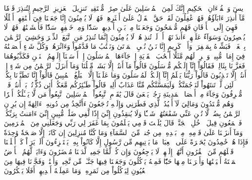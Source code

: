 يسٓ
وَٱلۡقُرۡءَانِ ٱلۡحَكِيمِ
إِنَّكَ لَمِنَ ٱلۡمُرۡسَلِينَ
عَلَىٰ صِرَٰطٖ مُّسۡتَقِيمٖ
تَنزِيلَ ٱلۡعَزِيزِ ٱلرَّحِيمِ
لِتُنذِرَ قَوۡمٗا مَّآ أُنذِرَ ءَابَآؤُهُمۡ فَهُمۡ غَٰفِلُونَ
لَقَدۡ حَقَّ ٱلۡقَوۡلُ عَلَىٰٓ أَكۡثَرِهِمۡ فَهُمۡ لَا يُؤۡمِنُونَ
إِنَّا جَعَلۡنَا فِيٓ أَعۡنَٰقِهِمۡ أَغۡلَٰلٗا فَهِيَ إِلَى ٱلۡأَذۡقَانِ فَهُم مُّقۡمَحُونَ
وَجَعَلۡنَا مِنۢ بَيۡنِ أَيۡدِيهِمۡ سَدّٗا وَمِنۡ خَلۡفِهِمۡ سَدّٗا فَأَغۡشَيۡنَٰهُمۡ فَهُمۡ لَا يُبۡصِرُونَ
وَسَوَآءٌ عَلَيۡهِمۡ ءَأَنذَرۡتَهُمۡ أَمۡ لَمۡ تُنذِرۡهُمۡ لَا يُؤۡمِنُونَ
إِنَّمَا تُنذِرُ مَنِ ٱتَّبَعَ ٱلذِّكۡرَ وَخَشِيَ ٱلرَّحۡمَٰنَ بِٱلۡغَيۡبِۖ فَبَشِّرۡهُ بِمَغۡفِرَةٖ وَأَجۡرٖ كَرِيمٍ
إِنَّا نَحۡنُ نُحۡيِ ٱلۡمَوۡتَىٰ وَنَكۡتُبُ مَا قَدَّمُواْ وَءَاثَٰرَهُمۡۚ وَكُلَّ شَيۡءٍ أَحۡصَيۡنَٰهُ فِيٓ إِمَامٖ مُّبِينٖ
وَٱضۡرِبۡ لَهُم مَّثَلًا أَصۡحَٰبَ ٱلۡقَرۡيَةِ إِذۡ جَآءَهَا ٱلۡمُرۡسَلُونَ
إِذۡ أَرۡسَلۡنَآ إِلَيۡهِمُ ٱثۡنَيۡنِ فَكَذَّبُوهُمَا فَعَزَّزۡنَا بِثَالِثٖ فَقَالُوٓاْ إِنَّآ إِلَيۡكُم مُّرۡسَلُونَ
قَالُواْ مَآ أَنتُمۡ إِلَّا بَشَرٞ مِّثۡلُنَا وَمَآ أَنزَلَ ٱلرَّحۡمَٰنُ مِن شَيۡءٍ إِنۡ أَنتُمۡ إِلَّا تَكۡذِبُونَ
قَالُواْ رَبُّنَا يَعۡلَمُ إِنَّآ إِلَيۡكُمۡ لَمُرۡسَلُونَ
وَمَا عَلَيۡنَآ إِلَّا ٱلۡبَلَٰغُ ٱلۡمُبِينُ
قَالُوٓاْ إِنَّا تَطَيَّرۡنَا بِكُمۡۖ لَئِن لَّمۡ تَنتَهُواْ لَنَرۡجُمَنَّكُمۡ وَلَيَمَسَّنَّكُم مِّنَّا عَذَابٌ أَلِيمٞ
قَالُواْ طَـٰٓئِرُكُم مَّعَكُمۡ أَئِن ذُكِّرۡتُمۚ بَلۡ أَنتُمۡ قَوۡمٞ مُّسۡرِفُونَ
وَجَآءَ مِنۡ أَقۡصَا ٱلۡمَدِينَةِ رَجُلٞ يَسۡعَىٰ قَالَ يَٰقَوۡمِ ٱتَّبِعُواْ ٱلۡمُرۡسَلِينَ
ٱتَّبِعُواْ مَن لَّا يَسۡـَٔلُكُمۡ أَجۡرٗا وَهُم مُّهۡتَدُونَ
وَمَالِيَ لَآ أَعۡبُدُ ٱلَّذِي فَطَرَنِي وَإِلَيۡهِ تُرۡجَعُونَ
ءَأَتَّخِذُ مِن دُونِهِۦٓ ءَالِهَةً إِن يُرِدۡنِ ٱلرَّحۡمَٰنُ بِضُرّٖ لَّا تُغۡنِ عَنِّي شَفَٰعَتُهُمۡ شَيۡـٔٗا وَلَا يُنقِذُونِ
إِنِّيٓ إِذٗا لَّفِي ضَلَٰلٖ مُّبِينٍ
إِنِّيٓ ءَامَنتُ بِرَبِّكُمۡ فَٱسۡمَعُونِ
قِيلَ ٱدۡخُلِ ٱلۡجَنَّةَۖ قَالَ يَٰلَيۡتَ قَوۡمِي يَعۡلَمُونَ
بِمَا غَفَرَ لِي رَبِّي وَجَعَلَنِي مِنَ ٱلۡمُكۡرَمِينَ
۞وَمَآ أَنزَلۡنَا عَلَىٰ قَوۡمِهِۦ مِنۢ بَعۡدِهِۦ مِن جُندٖ مِّنَ ٱلسَّمَآءِ وَمَا كُنَّا مُنزِلِينَ
إِن كَانَتۡ إِلَّا صَيۡحَةٗ وَٰحِدَةٗ فَإِذَا هُمۡ خَٰمِدُونَ
يَٰحَسۡرَةً عَلَى ٱلۡعِبَادِۚ مَا يَأۡتِيهِم مِّن رَّسُولٍ إِلَّا كَانُواْ بِهِۦ يَسۡتَهۡزِءُونَ
أَلَمۡ يَرَوۡاْ كَمۡ أَهۡلَكۡنَا قَبۡلَهُم مِّنَ ٱلۡقُرُونِ أَنَّهُمۡ إِلَيۡهِمۡ لَا يَرۡجِعُونَ
وَإِن كُلّٞ لَّمَّا جَمِيعٞ لَّدَيۡنَا مُحۡضَرُونَ
وَءَايَةٞ لَّهُمُ ٱلۡأَرۡضُ ٱلۡمَيۡتَةُ أَحۡيَيۡنَٰهَا وَأَخۡرَجۡنَا مِنۡهَا حَبّٗا فَمِنۡهُ يَأۡكُلُونَ
وَجَعَلۡنَا فِيهَا جَنَّـٰتٖ مِّن نَّخِيلٖ وَأَعۡنَٰبٖ وَفَجَّرۡنَا فِيهَا مِنَ ٱلۡعُيُونِ
لِيَأۡكُلُواْ مِن ثَمَرِهِۦ وَمَا عَمِلَتۡهُ أَيۡدِيهِمۡۚ أَفَلَا يَشۡكُرُونَ
